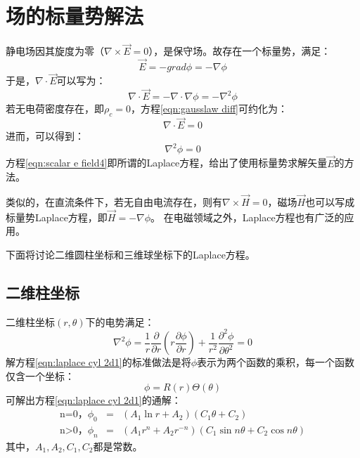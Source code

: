 \section{场的标量势解法}
静电场因其旋度为零（$\nabla \times \vec{E}=0$），是保守场。故存在一个标量势，满足：
\begin{equation}\label{eqn:scalar e field1}
  \vec{E}=-grad\phi = -\nabla \phi
\end{equation}
于是，$\nabla\cdot\vec{E}$可以写为：
\begin{equation}\label{eqn:scalar e field2}
  \nabla\cdot\vec{E}=-\nabla\cdot\nabla\phi=-\nabla^2\phi
\end{equation}
若无电荷密度存在，即$\rho_c=0$，方程\ref{eqn:gausslaw diff}可约化为：
\begin{equation}\label{eqn:scalar e field3}
  \nabla\cdot\vec{E}=0
\end{equation}
进而，可以得到：
\begin{equation}\label{eqn:scalar e field4}
\nabla^2\phi=0
\end{equation}
方程\ref{eqn:scalar e field4}即所谓的Laplace方程，给出了使用标量势求解矢量$\vec{E}$的方法。

类似的，在直流条件下，若无自由电流存在，则有$\nabla\times \vec{H}=0$，磁场$\vec{H}$也可以写成标量势Laplace方程，即$\vec{H}=-\nabla \phi$。
在电磁领域之外，Laplace方程也有广泛的应用。

下面将讨论二维圆柱坐标和三维球坐标下的Laplace方程。
\subsection{二维柱坐标}
二维柱坐标$(r,\theta)$下的电势满足：
\begin{equation}\label{eqn:laplace cyl 2d1}
  \nabla^2\phi = \frac{1}{r}\frac{\partial}{\partial r}(r\frac{\partial \phi}{\partial r})+\frac{1}{r^2}\frac{\partial^2\phi}{\partial\theta^2}=0
\end{equation}
解方程\ref{eqn:laplace cyl 2d1}的标准做法是将$\phi$表示为两个函数的乘积，每一个函数仅含一个坐标：
\begin{equation}\label{eqn:laplace cyl 2d2}
  \phi=R(r)\Theta(\theta)
\end{equation}
可解出方程\ref{eqn:laplace cyl 2d1}的通解：
\begin{eqnarray}\label{eqn:laplace cyl 2d3}
\mbox{n=0，}\phi_{0} &=& (A_1 \ln r+A_2)(C_1 \theta+C_2) \nonumber \\
\mbox{n>0，} \phi_{n} &=& (A_1 r^n+A_2 r^{-n})(C_1 \sin n\theta +C_2 \cos n\theta)
\end{eqnarray}
其中，$A_1, A_2, C_1, C_2$都是常数。

